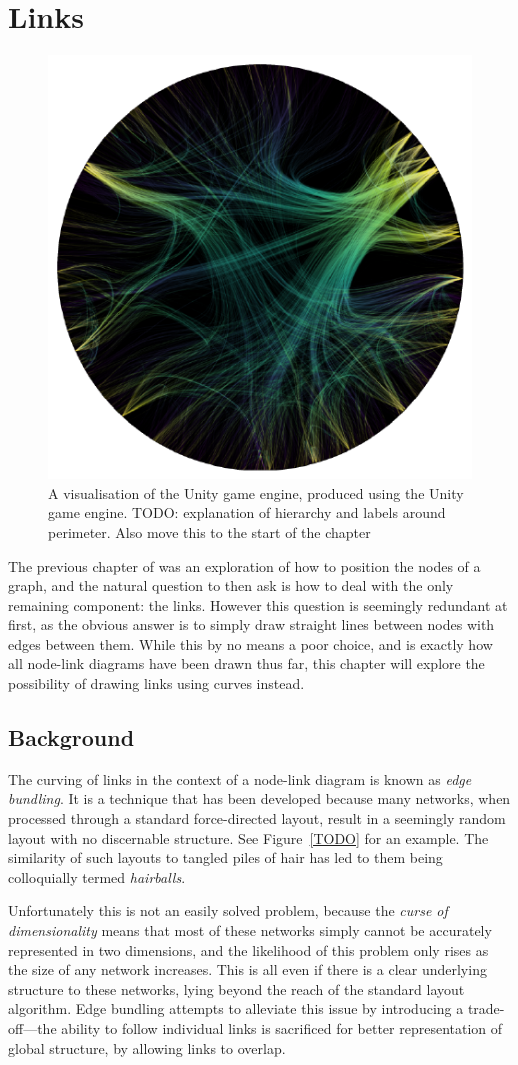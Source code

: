 \chapter{Links}
\begin{figure}
    \centering
    \includegraphics[width=.6\textwidth]{power/figures/metaunityplaceholder.png}
    \caption{A visualisation of the Unity game engine, produced using the Unity game engine. TODO: explanation of hierarchy and labels around perimeter. Also move this to the start of the chapter}
    \label{fig:metaunity}
\end{figure}
The previous chapter of was an exploration of how to position the nodes of a graph, and the natural question to then ask is how to deal with the only remaining component: the links. However this question is seemingly redundant at first, as the obvious answer is to simply draw straight lines between nodes with edges between them. While this by no means a poor choice, and is exactly how all node-link diagrams have been drawn thus far, this chapter will explore the possibility of drawing links using curves instead.

\section{Background}
The curving of links in the context of a node-link diagram is known as \textit{edge bundling}. It is a technique that has been developed because many networks, when processed through a standard force-directed layout, result in a seemingly random layout with no discernable structure. See Figure~\ref{TODO} for an example. The similarity of such layouts to tangled piles of hair has led to them being colloquially termed \textit{hairballs}.

Unfortunately this is not an easily solved problem, because the \textit{curse of dimensionality} \cite{Friedman2001} means that most of these networks simply cannot be accurately represented in two dimensions, and the likelihood of this problem only rises as the size of any network increases. This is all even if there is a clear underlying structure to these networks, lying beyond the reach of the standard layout algorithm.
Edge bundling attempts to alleviate this issue by introducing a trade-off---the ability to follow individual links is sacrificed for better representation of global structure, by allowing links to overlap.

